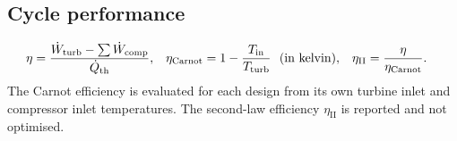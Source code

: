 
\subsection{Cycle performance}
\begin{align}
\eta &= \frac{\dot W_\mathrm{turb} - \sum \dot W_\mathrm{comp}}{\dot Q_\mathrm{th}}, &
\eta_\mathrm{Carnot} &= 1 - \frac{T_\mathrm{in}}{T_\mathrm{turb}}\ \ \text{(in kelvin)}, &
\eta_\mathrm{II} &= \frac{\eta}{\eta_\mathrm{Carnot}}.
\end{align}
The Carnot efficiency is evaluated for each design from its own turbine inlet and compressor inlet temperatures. The second-law efficiency $\eta_\mathrm{II}$ is reported and not optimised.

